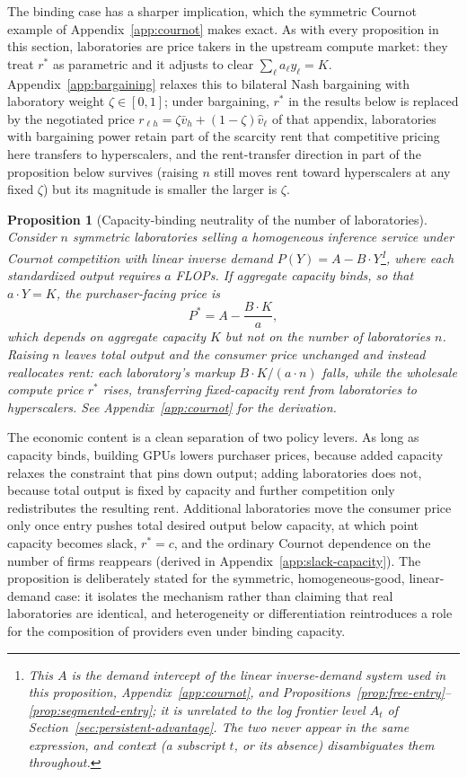 \documentclass[11pt]{article}
\newtheorem{proposition}{Proposition}
\begin{document}
The binding case has a sharper implication, which the symmetric Cournot example of Appendix~\ref{app:cournot} makes exact. As with every proposition in this section, laboratories are price takers in the upstream compute market: they treat $r^*$ as parametric and it adjusts to clear $\sum_\ell a_\ell y_\ell=K$. Appendix~\ref{app:bargaining} relaxes this to bilateral Nash bargaining with laboratory weight $\zeta\in[0,1]$; under bargaining, $r^*$ in the results below is replaced by the negotiated price $r_{\ell h}=\zeta\bar v_h+(1-\zeta)\widehat v_\ell$ of that appendix, laboratories with bargaining power retain part of the scarcity rent that competitive pricing here transfers to hyperscalers, and the rent-transfer direction in part of the proposition below survives (raising $n$ still moves rent toward hyperscalers at any fixed $\zeta$) but its magnitude is smaller the larger is $\zeta$.

\begin{proposition}[Capacity-binding neutrality of the number of laboratories]
\label{prop:capacity-neutrality}
Consider $n$ symmetric laboratories selling a homogeneous inference service under Cournot competition with linear inverse demand $P(Y)=A-B\cdot Y$\footnote{This $A$ is the demand intercept of the linear inverse-demand system used in this proposition, Appendix~\ref{app:cournot}, and Propositions~\ref{prop:free-entry}--\ref{prop:segmented-entry}; it is unrelated to the log frontier level $A_t$ of Section~\ref{sec:persistent-advantage}. The two never appear in the same expression, and context (a subscript $t$, or its absence) disambiguates them throughout.}, where each standardized output requires $a$ FLOPs. If aggregate capacity binds, so that $a\cdot Y=K$, the purchaser-facing price is
\begin{equation}P^*=A-\frac{B\cdot K}{a},\end{equation}
which depends on aggregate capacity $K$ but not on the number of laboratories $n$. Raising $n$ leaves total output and the consumer price unchanged and instead reallocates rent: each laboratory's markup $B\cdot K/(a\cdot n)$ falls, while the wholesale compute price $r^*$ rises, transferring fixed-capacity rent from laboratories to hyperscalers. See Appendix~\ref{app:cournot} for the derivation.
\end{proposition}

The economic content is a clean separation of two policy levers. As long as capacity binds, building GPUs lowers purchaser prices, because added capacity relaxes the constraint that pins down output; adding laboratories does not, because total output is fixed by capacity and further competition only redistributes the resulting rent. Additional laboratories move the consumer price only once entry pushes total desired output below capacity, at which point capacity becomes slack, $r^*=c$, and the ordinary Cournot dependence on the number of firms reappears (derived in Appendix~\ref{app:slack-capacity}). The proposition is deliberately stated for the symmetric, homogeneous-good, linear-demand case: it isolates the mechanism rather than claiming that real laboratories are identical, and heterogeneity or differentiation reintroduces a role for the composition of providers even under binding capacity.
\end{document}
